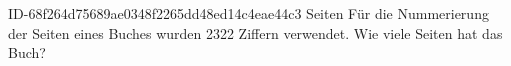 \begin{exercise}
      {ID-68f264d75689ae0348f2265dd48ed14c4eae44c3}
      {Seiten}
  \ifproblem\problem
    Für die Nummerierung der Seiten eines Buches wurden 2322 Ziffern verwendet.
    Wie viele Seiten hat das Buch?
  \fi
\end{exercise}
